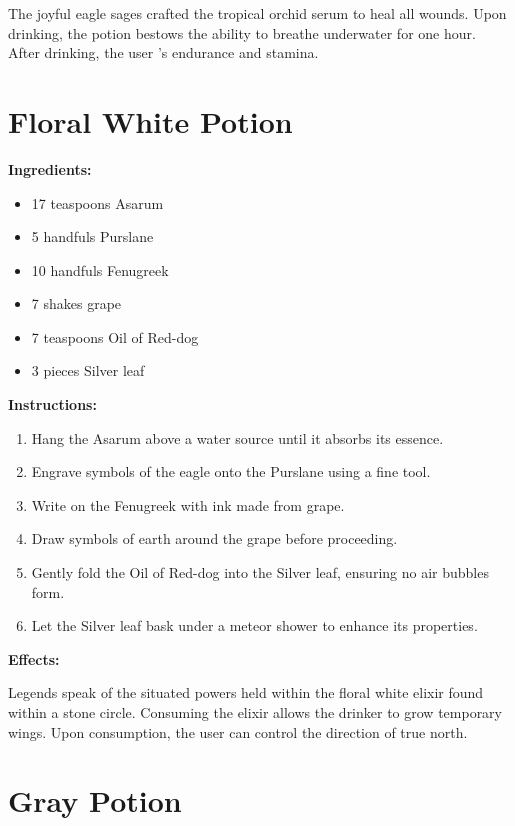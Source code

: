 \documentclass{article}
\begin{document}
The joyful eagle sages crafted the tropical orchid serum to heal all wounds. Upon drinking, the potion bestows the ability to breathe underwater for one hour. After drinking, the user 's endurance and stamina.

\newpage
\section*{Floral White Potion}

\textbf{Ingredients:}

\begin{itemize}
  \item 17 teaspoons Asarum
  \item 5 handfuls Purslane
  \item 10 handfuls Fenugreek
  \item 7 shakes grape
  \item 7 teaspoons Oil of Red-dog
  \item 3 pieces Silver leaf
\end{itemize}

\textbf{Instructions:}

\begin{enumerate}
  \item Hang the Asarum above a water source until it absorbs its essence.
  \item Engrave symbols of the eagle onto the Purslane using a fine tool.
  \item Write on the Fenugreek with ink made from grape.
  \item Draw symbols of earth around the grape before proceeding.
  \item Gently fold the Oil of Red-dog into the Silver leaf, ensuring no air bubbles form.
  \item Let the Silver leaf bask under a meteor shower to enhance its properties.
\end{enumerate}

\textbf{Effects:}

Legends speak of the situated powers held within the floral white elixir found within a stone circle. Consuming the elixir allows the drinker to grow temporary wings. Upon consumption, the user can control the direction of true north.

\newpage
\section*{Gray Potion}
\end{document}
